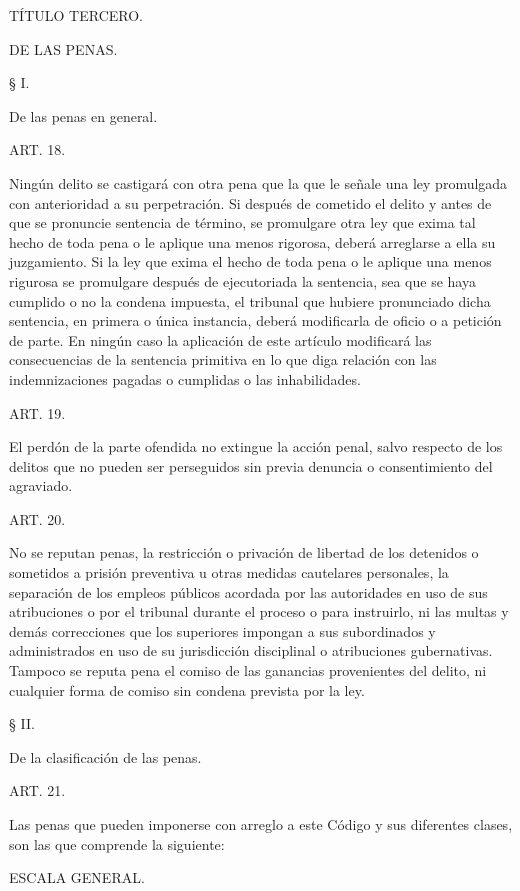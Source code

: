     TÍTULO TERCERO.

    DE LAS PENAS.



    § I.

    De las penas en general.


    ART. 18.

    Ningún delito se castigará con otra pena que la que le señale una ley promulgada con anterioridad a su perpetración.
    Si después de cometido el delito y antes de que se pronuncie sentencia de término, se promulgare otra ley que exima tal hecho de toda pena o le aplique una menos rigorosa, deberá arreglarse a ella su juzgamiento.
    Si la ley que exima el hecho de toda pena o le aplique una menos rigurosa se promulgare después de ejecutoriada la sentencia, sea que se haya cumplido o no la condena impuesta, el tribunal que hubiere pronunciado dicha sentencia, en primera o única instancia, deberá modificarla de oficio o a petición de parte.
    En ningún caso la aplicación de este artículo modificará las consecuencias de la sentencia primitiva en lo que diga relación con las indemnizaciones pagadas o cumplidas o las inhabilidades.


    ART. 19.

    El perdón de la parte ofendida no extingue la acción penal, salvo respecto de los delitos que no pueden ser perseguidos sin previa denuncia o consentimiento del agraviado.


    ART. 20.

    No se reputan penas, la restricción o privación de libertad de los detenidos o sometidos a prisión preventiva u otras medidas cautelares personales, la separación de los empleos públicos acordada por las autoridades en uso de sus atribuciones o por el tribunal durante el proceso o para instruirlo, ni las multas y demás correcciones que los superiores impongan a sus subordinados y administrados en uso de su jurisdicción disciplinal o atribuciones gubernativas.
    Tampoco se reputa pena el comiso de las ganancias provenientes del delito, ni cualquier forma de comiso sin condena prevista por la ley.



    § II.

    De la clasificación de las penas.


    ART. 21.

    Las penas que pueden imponerse con arreglo a este Código y sus diferentes clases, son las que comprende la siguiente:

    ESCALA GENERAL.

